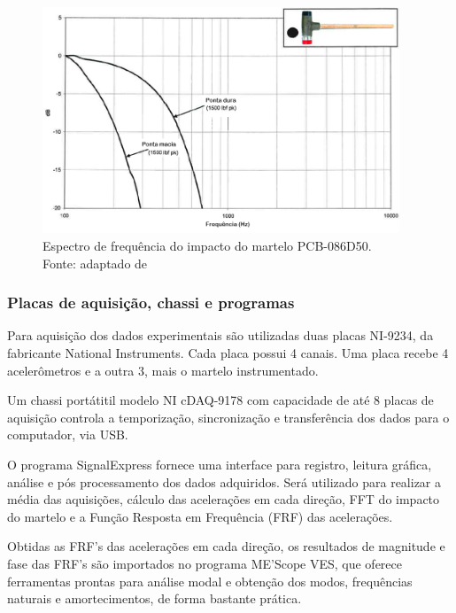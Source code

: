 \begin{figure}[h]
	\centering 
 	\includegraphics[width=0.95\textwidth]{figs/carta_badwidth}
 	\caption[Espectro de frequência do impacto do martelo PCB-086D50]{Espectro de
 	frequência do impacto do martelo PCB-086D50. \\	Fonte: adaptado de~\cite{manualpcb} }
 	\label{fig::carta_badwidth}
\end{figure}


\subsubsection{Placas de aquisição, chassi e programas}

Para aquisição dos dados experimentais são utilizadas duas placas NI-9234, da
fabricante National Instruments. Cada placa possui 4 canais. Uma placa recebe 4
acelerômetros e a outra 3, mais o martelo instrumentado.

Um chassi portátitil modelo NI cDAQ-9178 com capacidade de até 8 placas
de aquisição controla a temporização, sincronização e transferência dos dados
para o computador, via USB. 

O programa SignalExpress fornece uma interface para registro, leitura gráfica,
análise e pós processamento dos dados adquiridos. Será utilizado para realizar
a média das aquisições, cálculo das acelerações em cada direção, FFT do impacto
do martelo e a Função Resposta em Frequência (FRF) das acelerações.

Obtidas as FRF's das acelerações em cada direção, os resultados de
magnitude e fase das FRF's são importados no programa ME'Scope VES, que oferece
ferramentas prontas para análise modal e obtenção dos modos, frequências
naturais e amortecimentos, de forma bastante prática.

